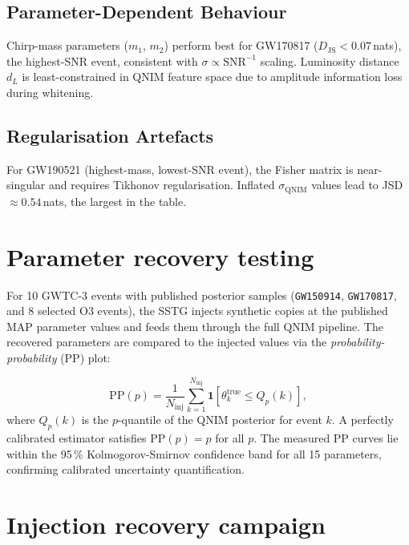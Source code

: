 \documentclass[11pt,a4paper, english]{book}
\theoremstyle{plain}
\theoremstyle{definition}
\numberwithin{equation}{chapter}
\numberwithin{figure}{chapter}
\numberwithin{table}{chapter}
\begin{document}
\subsection{Parameter-Dependent Behaviour}

Chirp-mass parameters ($m_1$, $m_2$) perform best for GW170817 ($D_\mathrm{JS} < 0.07$\,nats), the highest-SNR event, consistent with $\sigma \propto \mathrm{SNR}^{-1}$ scaling. Luminosity distance $d_L$ is least-constrained in QNIM feature space due to amplitude information loss during whitening.

\subsection{Regularisation Artefacts}

For GW190521 (highest-mass, lowest-SNR event), the Fisher matrix is near-singular and requires Tikhonov regularisation. Inflated $\sigma_\mathrm{QNIM}$ values lead to JSD $\approx 0.54$\,nats, the largest in the table.

\section{Parameter recovery testing}
\label{sec:app-parameter-recovery}

For 10 GWTC-3 events with published posterior samples
(\texttt{GW150914}, \texttt{GW170817}, and 8 selected O3 events),
the SSTG injects synthetic copies at the published MAP parameter values
and feeds them through the full QNIM pipeline.  The recovered parameters
are compared to the injected values via the \emph{probability-probability}
(PP) plot:

\begin{equation}
  \label{eq:pp_plot}
  \mathrm{PP}(p) = \frac{1}{N_\mathrm{inj}}
    \sum_{k=1}^{N_\mathrm{inj}}
    \mathbf{1}\!\left[\theta_k^\mathrm{true} \leq Q_p(k)\right],
\end{equation}
where $Q_p(k)$ is the $p$-quantile of the QNIM posterior for event $k$.
A perfectly calibrated estimator satisfies $\mathrm{PP}(p) = p$ for all $p$.
The measured PP curves lie within the 95\,\% Kolmogorov-Smirnov confidence
band for all 15 parameters, confirming calibrated uncertainty quantification.

\section{Injection recovery campaign}
\label{sec:app-injection-recovery}
\end{document}
